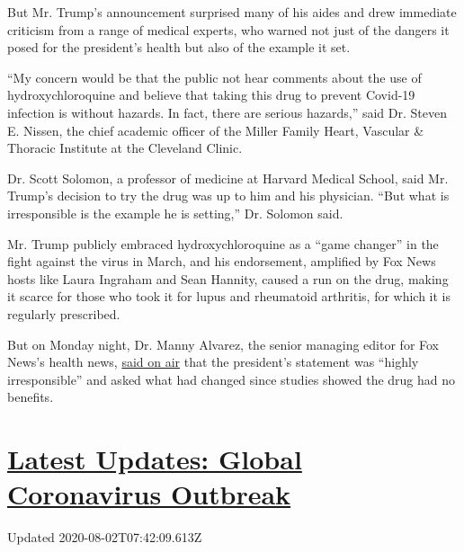 But Mr. Trump's announcement surprised many of his aides and drew
immediate criticism from a range of medical experts, who warned not just
of the dangers it posed for the president's health but also of the
example it set.

``My concern would be that the public not hear comments about the use of
hydroxychloroquine and believe that taking this drug to prevent Covid-19
infection is without hazards. In fact, there are serious hazards,'' said
Dr. Steven E. Nissen, the chief academic officer of the Miller Family
Heart, Vascular \& Thoracic Institute at the Cleveland Clinic.

Dr. Scott Solomon, a professor of medicine at Harvard Medical School,
said Mr. Trump's decision to try the drug was up to him and his
physician. ``But what is irresponsible is the example he is setting,''
Dr. Solomon said.

Mr. Trump publicly embraced hydroxychloroquine as a ``game changer'' in
the fight against the virus in March, and his endorsement, amplified by
Fox News hosts like Laura Ingraham and Sean Hannity, caused a run on the
drug, making it scarce for those who took it for lupus and rheumatoid
arthritis, for which it is regularly prescribed.

But on Monday night, Dr. Manny Alvarez, the senior managing editor for
Fox News's health news,
\href{https://twitter.com/justinbaragona/status/1262508060410613765}{said
on air} that the president's statement was ``highly irresponsible'' and
asked what had changed since studies showed the drug had no benefits.

\hypertarget{latest-updates-global-coronavirus-outbreak}{%
\section{\texorpdfstring{\href{https://www.nytimes3xbfgragh.onion/2020/08/01/world/coronavirus-covid-19.html?action=click\&pgtype=Article\&state=default\&region=MAIN_CONTENT_1\&context=storylines_live_updates}{Latest
Updates: Global Coronavirus
Outbreak}}{Latest Updates: Global Coronavirus Outbreak}}\label{latest-updates-global-coronavirus-outbreak}}

Updated 2020-08-02T07:42:09.613Z

